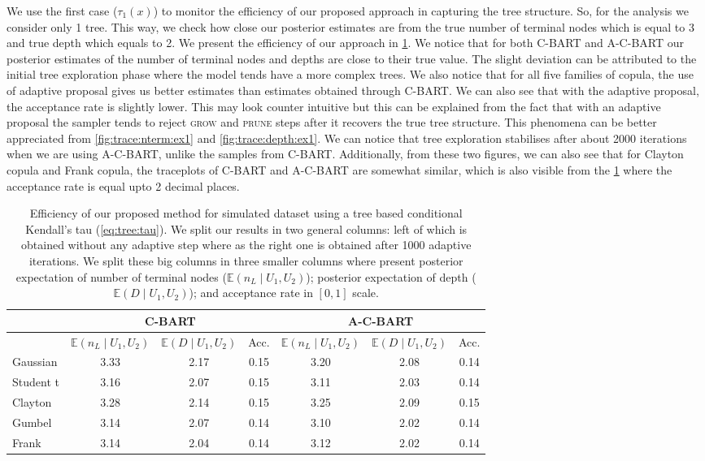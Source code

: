 \documentclass{amsart}
\begin{document}
We use the first case ($\tau_1(x)$) to monitor the efficiency of our proposed approach in capturing the tree structure. So, for the analysis we consider only 1 tree. This way, we check how close our posterior estimates are from the true number of terminal nodes which is equal to 3 and true depth which equals to 2. We present the efficiency of our approach in \cref{tab:eff:ex1}. We notice that for both C-BART and A-C-BART our posterior estimates of the number of terminal nodes and depths are close to their true value. The slight deviation can be attributed to the initial tree exploration phase where the model tends have a more complex trees. We also notice that for all five families of copula, the use of adaptive proposal gives us better estimates than estimates obtained through C-BART. We can also see that with the adaptive proposal, the acceptance rate is slightly lower. This may look counter intuitive but this can be explained from the fact that with an adaptive proposal the sampler tends to reject \textsc{grow} and \textsc{prune} steps after it recovers the true tree structure. This phenomena can be better appreciated from \cref{fig:trace:nterm:ex1} and \cref{fig:trace:depth:ex1}. We can notice that tree exploration stabilises after about 2000 iterations when we are using A-C-BART, unlike the samples from C-BART. Additionally, from these two figures, we can also see that for Clayton copula and Frank copula, the traceplots of C-BART and A-C-BART are somewhat similar, which is also visible from the \cref{tab:eff:ex1} where the acceptance rate is equal upto 2 decimal places. 

\begin{table}[ht]
	\centering
	\begin{tabular}{l|ccc|ccc}
		\multicolumn{1}{c|}{} &
		\multicolumn{3}{c|}{C-BART} &
		\multicolumn{3}{c}{A-C-BART} \\
		\midrule
		& $\mathbb{E}(n_L\mid U_1,U_2)$ & $\mathbb{E}(D\mid U_1,U_2)$ & Acc. & $\mathbb{E}(n_L\mid U_1,U_2)$ & $\mathbb{E}(D\mid U_1,U_2)$ & Acc. \\ 
		\midrule
		Gaussian & 3.33 & 2.17 & 0.15 & 3.20 & 2.08 & 0.14 \\ 
		Student t & 3.16 & 2.07 & 0.15 & 3.11 & 2.03 & 0.14 \\ 
		Clayton & 3.28 & 2.14 & 0.15 & 3.25 & 2.09 & 0.15 \\ 
		Gumbel & 3.14 & 2.07 & 0.14 & 3.10 & 2.02 & 0.14 \\ 
		Frank & 3.14 & 2.04 & 0.14 & 3.12 & 2.02 & 0.14 \\ 
	\end{tabular}
	\caption{Efficiency of our proposed method for simulated dataset using a tree based conditional Kendall's tau (\cref{eq:tree:tau}). We split our results in two general columns: left of which is obtained without any adaptive step where as the right one is obtained after 1000 adaptive iterations. We split these big columns in three smaller columns where present posterior expectation of number of terminal nodes ($\mathbb{E}(n_L\mid U_1,U_2)$); posterior expectation of depth ($\mathbb{E}(D\mid U_1,U_2)$); and acceptance rate in $[0,1]$ scale.}
	\label{tab:eff:ex1}
\end{table}
\end{document}
